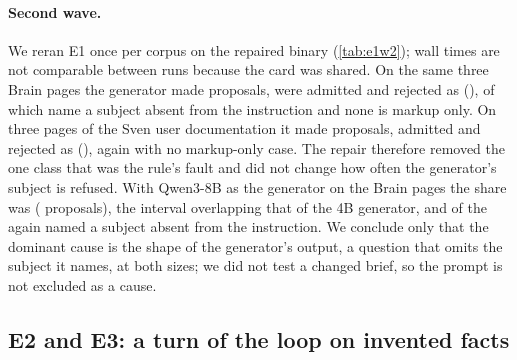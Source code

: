 \paragraph{Second wave.} We reran E1 once per corpus on the repaired binary
(\cref{tab:e1w2}); wall times are not comparable between runs because the card was shared.
On the same three Brain pages the generator made \mEOneaProposals{} proposals, \mEOneaAdmittedProposals{} were
admitted and \mEOneaReasonNoSubject{} rejected as 
(\mEOneaShareNoSubject), of which \mEOneaClassAbsent{} name a subject absent from the instruction
and none is markup only. On three pages of the Sven user documentation it made
\mEOnebProposals{} proposals, admitted \mEOnebAdmittedProposals{} and rejected \mEOnebReasonNoSubject{}
as  (\mEOnebShareNoSubject), again with no markup-only case.
The repair therefore removed the one class that was the rule's fault and did not change how
often the generator's subject is refused. With Qwen3-8B as the generator on the Brain pages the
share was \mEOnecShareNoSubject{} (\mEOnecProposals{} proposals), the interval overlapping that of
the 4B generator, and \mEOnecClassAbsent{} of the \mEOnecReasonNoSubject{} again named a subject
absent from the instruction. We conclude only that the dominant cause is the shape of
the generator's output, a question that omits the subject it names, at both sizes; we did not
test a changed brief, so the prompt is not excluded as a cause.

\begin{table}[t]
\centering
\small

\caption{E1, second wave: proposals and their fate by run. The last column splits the
 rejections into subject absent from the instruction, its words apart, not
in the source, and markup only.}\label{tab:e1w2}
\end{table}

\begin{table}[t]
\centering

\caption{E1: admissions and rejections of the task funnel (Qwen3-4B generator, three
documentation pages, one run).}\label{tab:e1}
\end{table}

\subsection{E2 and E3: a turn of the loop on invented facts}\label{sec:e2}

